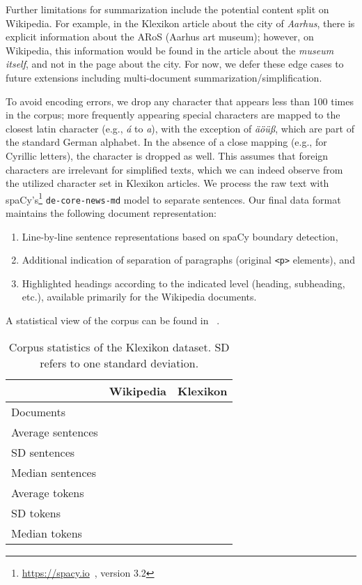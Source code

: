 \documentclass[10pt, a4paper]{article}
\begin{document}
Further limitations for summarization include the potential content split on Wikipedia. For example, in the Klexikon article about the city of \emph{Aarhus}, there is explicit information about the ARoS (Aarhus art museum); however, on Wikipedia, this information would be found in the article about the \emph{museum itself}, and not in the page about the city. For now, we defer these edge cases to future extensions including multi-document summarization/simplification. 

To avoid encoding errors, we drop any character that appears less than 100 times in the corpus; more frequently appearing special characters are mapped to the closest latin character (e.g., \emph{\'{a}} to \emph{a}), with the exception of \emph{äöüß}, which are part of the standard German alphabet. In the absence of a close mapping (e.g., for Cyrillic letters), the character is dropped as well.
This assumes that foreign characters are irrelevant for simplified texts, which we can indeed observe from the utilized character set in Klexikon articles.
We process the raw text with spaCy's\footnote{\url{https://spacy.io}~, version 3.2} \texttt{de-core-news-md} model to separate sentences.
Our final data format maintains the following document representation:
\begin{enumerate}
	\item Line-by-line sentence representations based on spaCy boundary detection,
	\item Additional indication of separation of paragraphs (original \texttt{<p>} elements), and
	\item Highlighted headings according to the indicated level (heading, subheading, etc.), available primarily for the Wikipedia documents.
\end{enumerate}
A statistical view of the corpus can be found in ~.

\begin{table}[t]
	\centering
	\begin{tabular}{lr|r}
		\hline
		\textbf{} & \textbf{Wikipedia} & \textbf{Klexikon} \\
		\hline
		Documents &  &  \\
		\hline
		Average sentences &  &  \\
		SD sentences &  &  \\
		Median sentences &  &  \\
		\hline
		Average tokens &  &  \\
		SD tokens &  &  \\
		Median tokens &  &  \\
		
	\end{tabular}
	\caption{Corpus statistics of the Klexikon dataset. SD refers to one standard deviation.}
	\label{tab:detailed}
\end{table}
\end{document}

